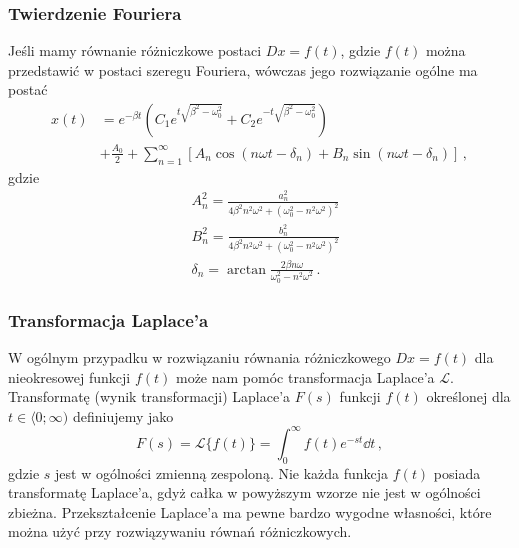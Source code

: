\documentclass[../main.tex]{subfiles}
\begin{document}
\subsubsection{Twierdzenie Fouriera}
\noindent{}
\medskip

Jeśli mamy równanie różniczkowe postaci \(Dx=f(t)\), gdzie \(f(t)\) można przedstawić w postaci szeregu Fouriera, wówczas jego rozwiązanie ogólne ma postać
\begin{equation*}
\begin{split}
    x(t)&=e^{-\beta t}\left(C_1e^{t\sqrt{\beta^2-\omega_0^2}}+C_2e^{-t\sqrt{\beta^2-\omega_0^2}}\right)\\
    &+\frac{A_0}{2}+\sum_{n=1}^\infty \left[A_n\cos (n\omega t-\delta_n)+B_n\sin (n\omega t-\delta_n)\right]\,,
\end{split}
\end{equation*}
gdzie
\begin{equation*}
\begin{split}
    &A_n^2=\frac{a_n^2}{4\beta^2n^2\omega^2+(\omega_0^2-n^2\omega^2)^2}\\
    &B_n^2=\frac{b_n^2}{4\beta^2n^2\omega^2+(\omega_0^2-n^2\omega^2)^2}\\
    &\delta_n=\arctan\frac{2\beta n\omega}{\omega_0^2-n^2\omega^2}\,.
\end{split}
\end{equation*}
\subsubsection{Transformacja Laplace'a}
W ogólnym przypadku w rozwiązaniu równania różniczkowego \(Dx=f(t)\) dla nieokresowej funkcji \(f(t)\) może nam pomóc transformacja Laplace'a \(\mathscr{L}\). Transformatę (wynik transformacji) Laplace'a \(F(s)\) funkcji \(f(t)\) określonej dla \(t\in\langle 0;\infty)\) definiujemy jako
\begin{equation*}
    F(s)=\mathscr{L}\{f(t)\}=\int_0^\infty f(t)e^{-st}\dd{t}\,,
\end{equation*}
gdzie \(s\) jest w ogólności zmienną zespoloną. Nie każda funkcja \(f(t)\) posiada transformatę Laplace'a, gdyż całka w powyższym wzorze nie jest w ogólności zbieżna. Przekształcenie Laplace'a ma pewne bardzo wygodne własności, które można użyć przy rozwiązywaniu równań różniczkowych.
\end{document}
